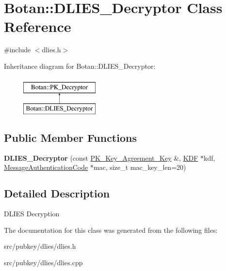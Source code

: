 \hypertarget{classBotan_1_1DLIES__Decryptor}{\section{Botan\-:\-:D\-L\-I\-E\-S\-\_\-\-Decryptor Class Reference}
\label{classBotan_1_1DLIES__Decryptor}
}


{\ttfamily \#include $<$dlies.\-h$>$}

Inheritance diagram for Botan\-:\-:D\-L\-I\-E\-S\-\_\-\-Decryptor\-:\begin{figure}[H]
\begin{center}
\leavevmode
\includegraphics[height=2.000000cm]{classBotan_1_1DLIES__Decryptor}
\end{center}
\end{figure}
\subsection*{Public Member Functions}
\begin{DoxyCompactItemize}
\item 
\hypertarget{classBotan_1_1DLIES__Decryptor_ae13cc42c330387b7c91398cd7e9e9223}{{\bfseries D\-L\-I\-E\-S\-\_\-\-Decryptor} (const \hyperlink{classBotan_1_1PK__Key__Agreement__Key}{P\-K\-\_\-\-Key\-\_\-\-Agreement\-\_\-\-Key} \&, \hyperlink{classBotan_1_1KDF}{K\-D\-F} $\ast$kdf, \hyperlink{classBotan_1_1MessageAuthenticationCode}{Message\-Authentication\-Code} $\ast$mac, size\-\_\-t mac\-\_\-key\-\_\-len=20)}\label{classBotan_1_1DLIES__Decryptor_ae13cc42c330387b7c91398cd7e9e9223}

\end{DoxyCompactItemize}


\subsection{Detailed Description}
D\-L\-I\-E\-S Decryption 

The documentation for this class was generated from the following files\-:\begin{DoxyCompactItemize}
\item 
src/pubkey/dlies/dlies.\-h\item 
src/pubkey/dlies/dlies.\-cpp\end{DoxyCompactItemize}
